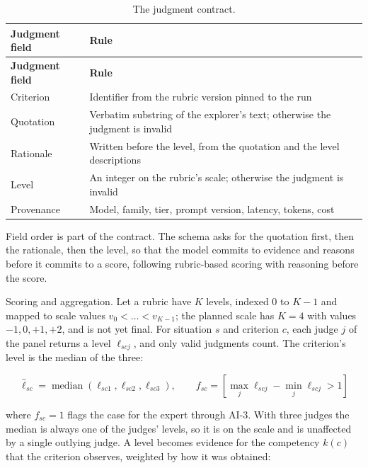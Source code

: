 {\small
\begin{longtable}{|>{\raggedright\arraybackslash}p{}|>{\raggedright\arraybackslash}p{}|}
\caption{The judgment contract.} \\
\hline
\textbf{Judgment field} & \textbf{Rule} \\ \hline
\endfirsthead
\hline
\textbf{Judgment field} & \textbf{Rule} \\ \hline
\endhead
Criterion & Identifier from the rubric version pinned to the run \\ \hline
Quotation & Verbatim substring of the explorer's text; otherwise the judgment is invalid \\ \hline
Rationale & Written before the level, from the quotation and the level descriptions \\ \hline
Level & An integer on the rubric's scale; otherwise the judgment is invalid \\ \hline
Provenance & Model, family, tier, prompt version, latency, tokens, cost \\ \hline
\end{longtable}
}

Field order is part of the contract. The schema asks for the quotation first, then the rationale, then the level, so that the model commits to evidence and reasons before it commits to a score, following rubric-based scoring with reasoning before the score\cite{r58}.

Scoring and aggregation. Let a rubric have $K$ levels, indexed $0$ to $K-1$ and mapped to scale values $v_0 < \dots < v_{K-1}$; the planned scale has $K = 4$ with values $-1, 0, +1, +2$, and is not yet final. For situation $s$ and criterion $c$, each judge $j$ of the panel returns a level $\ell_{scj}$, and only valid judgments count. The criterion's level is the median of the three:

\begin{equation}
\hat{\ell}_{sc} = \operatorname{median}(\ell_{sc1}, \ell_{sc2}, \ell_{sc3}), \qquad f_{sc} = \left[\max_j \ell_{scj} - \min_j \ell_{scj} > 1\right]
\end{equation}

where $f_{sc} = 1$ flags the case for the expert through AI-3. With three judges the median is always one of the judges' levels, so it is on the scale and is unaffected by a single outlying judge. A level becomes evidence for the competency $k(c)$ that the criterion observes, weighted by how it was obtained:

